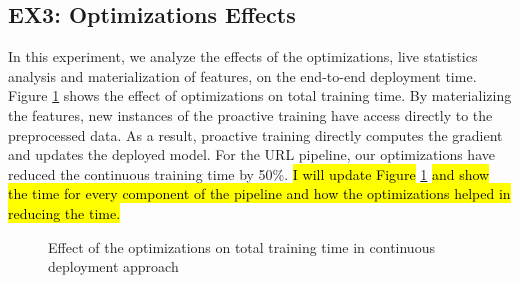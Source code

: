 \subsection{EX3: Optimizations Effects}
In this experiment, we analyze the effects of the optimizations, live statistics analysis and materialization of features, on the end-to-end deployment time.
Figure \ref{optimization-effect} shows the effect of optimizations on total training time.
By materializing the features, new instances of the proactive training have access directly to the preprocessed data.
As a result, proactive training directly computes the gradient and updates the deployed model.
For the URL pipeline, our optimizations have reduced the continuous training time by 50\%.
\hl{I will update Figure} \ref{optimization-effect} \hl{and show the time for every component of the pipeline and how the optimizations helped in reducing the time.}
\begin{figure}[h!]
\centering
\resizebox{\columnwidth}{!}{}
\caption{Effect of the optimizations on total training time in continuous deployment approach}
\label{optimization-effect}
\end{figure}

